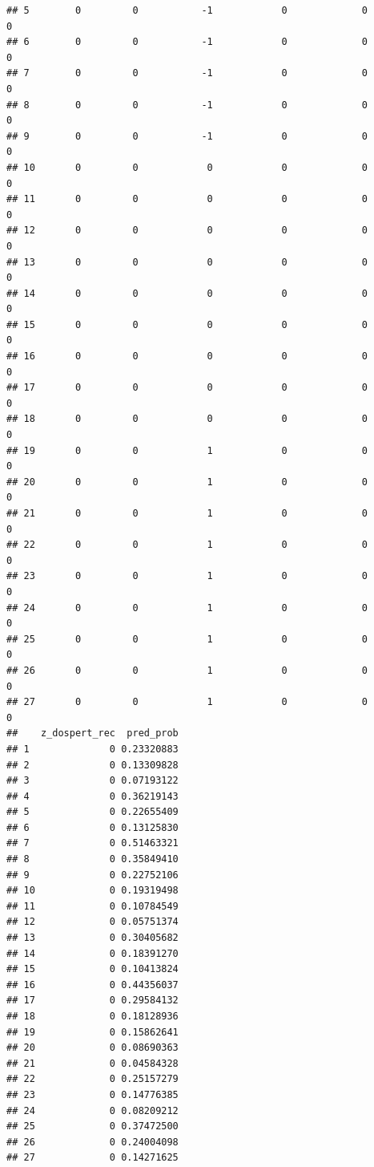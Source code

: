 \documentclass[
]{article}
\begin{document}
\begin{verbatim}
## 5        0         0           -1            0             0               0
## 6        0         0           -1            0             0               0
## 7        0         0           -1            0             0               0
## 8        0         0           -1            0             0               0
## 9        0         0           -1            0             0               0
## 10       0         0            0            0             0               0
## 11       0         0            0            0             0               0
## 12       0         0            0            0             0               0
## 13       0         0            0            0             0               0
## 14       0         0            0            0             0               0
## 15       0         0            0            0             0               0
## 16       0         0            0            0             0               0
## 17       0         0            0            0             0               0
## 18       0         0            0            0             0               0
## 19       0         0            1            0             0               0
## 20       0         0            1            0             0               0
## 21       0         0            1            0             0               0
## 22       0         0            1            0             0               0
## 23       0         0            1            0             0               0
## 24       0         0            1            0             0               0
## 25       0         0            1            0             0               0
## 26       0         0            1            0             0               0
## 27       0         0            1            0             0               0
##    z_dospert_rec  pred_prob
## 1              0 0.23320883
## 2              0 0.13309828
## 3              0 0.07193122
## 4              0 0.36219143
## 5              0 0.22655409
## 6              0 0.13125830
## 7              0 0.51463321
## 8              0 0.35849410
## 9              0 0.22752106
## 10             0 0.19319498
## 11             0 0.10784549
## 12             0 0.05751374
## 13             0 0.30405682
## 14             0 0.18391270
## 15             0 0.10413824
## 16             0 0.44356037
## 17             0 0.29584132
## 18             0 0.18128936
## 19             0 0.15862641
## 20             0 0.08690363
## 21             0 0.04584328
## 22             0 0.25157279
## 23             0 0.14776385
## 24             0 0.08209212
## 25             0 0.37472500
## 26             0 0.24004098
## 27             0 0.14271625
\end{verbatim}
\end{document}
